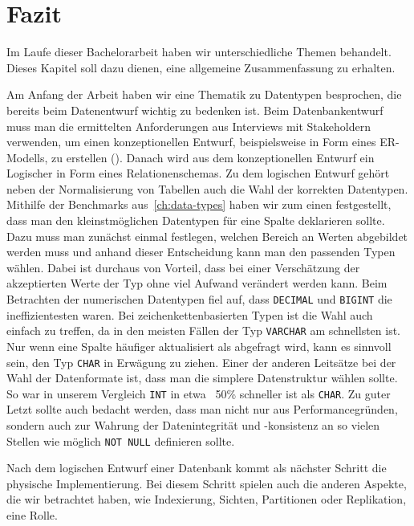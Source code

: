 \chapter{Fazit}\label{ch:fazit}

Im Laufe dieser Bachelorarbeit haben wir unterschiedliche Themen behandelt.
Dieses Kapitel soll dazu dienen, eine allgemeine Zusammenfassung zu erhalten.

Am Anfang der Arbeit haben wir eine Thematik zu Datentypen besprochen, die bereits beim Datenentwurf wichtig zu bedenken ist.
Beim Datenbankentwurf muss man die ermittelten Anforderungen aus Interviews mit Stakeholdern verwenden, um einen konzeptionellen Entwurf, beispielsweise in Form eines ER-Modells, zu erstellen (\cite{db_entwurf_erklaerung}).
Danach wird aus dem konzeptionellen Entwurf ein Logischer in Form eines Relationenschemas.
Zu dem logischen Entwurf gehört neben der Normalisierung von Tabellen auch die Wahl der korrekten Datentypen.
Mithilfe der Benchmarks aus~\ref{ch:data-types} haben wir zum einen festgestellt, dass man den kleinstmöglichen Datentypen für eine Spalte deklarieren sollte.
Dazu muss man zunächst einmal festlegen, welchen Bereich an Werten abgebildet werden muss und anhand dieser Entscheidung kann man den passenden Typen wählen.
Dabei ist durchaus von Vorteil, dass bei einer Verschätzung der akzeptierten Werte der Typ ohne viel Aufwand verändert werden kann.
Beim Betrachten der numerischen Datentypen fiel auf, dass \texttt{DECIMAL} und \texttt{BIGINT} die ineffizientesten waren.
Bei zeichenkettenbasierten Typen ist die Wahl auch einfach zu treffen, da in den meisten Fällen der Typ \texttt{VARCHAR} am schnellsten ist.
Nur wenn eine Spalte häufiger aktualisiert als abgefragt wird, kann es sinnvoll sein, den Typ \texttt{CHAR} in Erwägung zu ziehen.
Einer der anderen Leitsätze bei der Wahl der Datenformate ist, dass man die simplere Datenstruktur wählen sollte.
So war in unserem Vergleich \texttt{INT} in etwa ~50\% schneller ist als \texttt{CHAR}.
Zu guter Letzt sollte auch bedacht werden, dass man nicht nur aus Performancegründen, sondern auch zur Wahrung der Datenintegrität und -konsistenz an so vielen Stellen wie möglich \texttt{NOT NULL} definieren sollte.

Nach dem logischen Entwurf einer Datenbank kommt als nächster Schritt die physische Implementierung.
Bei diesem Schritt spielen auch die anderen Aspekte, die wir betrachtet haben, wie Indexierung, Sichten, Partitionen oder Replikation, eine Rolle.

